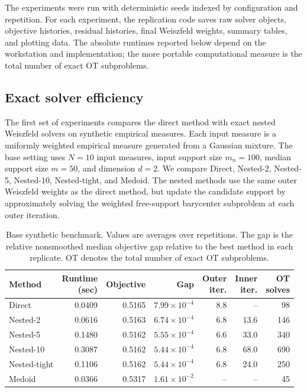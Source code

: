 \documentclass[pdflatex,sn-mathphys-ay]{sn-jnl}%
\theoremstyle{thmstyleone}%
\theoremstyle{thmstyletwo}%
\theoremstyle{thmstylethree}%
\begin{document}
The experiments were run with deterministic seeds indexed by configuration and repetition. For each experiment, the replication code saves raw solver objects, objective histories, residual histories, final Weiszfeld weights, summary tables, and plotting data. The absolute runtimes reported below depend on the workstation and implementation; the more portable computational measure is the total number of exact OT subproblems.

\subsection{Exact solver efficiency}\label{sec:exp-efficiency}

The first set of experiments compares the direct method with exact nested Weiszfeld solvers on synthetic empirical measures. Each input measure is a uniformly weighted empirical measure generated from a Gaussian mixture. The base setting uses \(N=10\) input measures, input support size \(m_n=100\), median support size \(m=50\), and dimension \(d=2\). We compare Direct, Nested-2, Nested-5, Nested-10, Nested-tight, and Medoid. The nested methods use the same outer Weiszfeld weights as the direct method, but update the candidate support by approximately solving the weighted free-support barycenter subproblem at each outer iteration.

\begin{table}[t]
\centering
\small
\setlength{\tabcolsep}{4pt}
\renewcommand{\arraystretch}{1.12}
\caption{Base synthetic benchmark. Values are averages over repetitions. The gap is the relative nonsmoothed median objective gap relative to the best method in each replicate. OT denotes the total number of exact OT subproblems.}
\label{tab:exp-base-solver}
\begin{tabular}{lrrrrrr}
\toprule
Method &
\makecell{Runtime\\(sec)} &
Objective &
Gap &
\makecell{Outer\\iter.} &
\makecell{Inner\\iter.} &
\makecell{OT\\solves} \\
\midrule
Direct       & 0.0409 & 0.5165 & \(7.99\times10^{-4}\) & 8.8 & --   & 98  \\
Nested-2     & 0.0616 & 0.5163 & \(6.74\times10^{-4}\) & 6.8 & 13.6 & 146 \\
Nested-5     & 0.1480 & 0.5162 & \(5.55\times10^{-4}\) & 6.6 & 33.0 & 340 \\
Nested-10    & 0.3087 & 0.5162 & \(5.44\times10^{-4}\) & 6.8 & 68.0 & 690 \\
Nested-tight & 0.1106 & 0.5162 & \(5.44\times10^{-4}\) & 6.8 & 24.0 & 250 \\
Medoid       & 0.0366 & 0.5317 & \(1.61\times10^{-2}\) & --  & --   & 45  \\
\bottomrule
\end{tabular}
\end{table}
\end{document}

